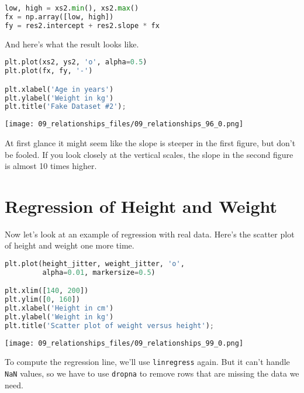 \begin{lstlisting}[language=Python,style=source]
low, high = xs2.min(), xs2.max()
fx = np.array([low, high])
fy = res2.intercept + res2.slope * fx
\end{lstlisting}

And here's what the result looks like.

\begin{lstlisting}[language=Python,style=source]
plt.plot(xs2, ys2, 'o', alpha=0.5)
plt.plot(fx, fy, '-')

plt.xlabel('Age in years')
plt.ylabel('Weight in kg')
plt.title('Fake Dataset #2');
\end{lstlisting}

\begin{center}
\texttt{[image: 09\_relationships\_files/09\_relationships\_96\_0.png]}
\end{center}

At first glance it might seem like the slope is steeper in the first
figure, but don't be fooled. If you look closely at the vertical scales,
the slope in the second figure is almost 10 times higher.

\section{Regression of Height and
Weight}\label{regression-of-height-and-weight}

Now let's look at an example of regression with real data. Here's the
scatter plot of height and weight one more time.

\begin{lstlisting}[language=Python,style=source]
plt.plot(height_jitter, weight_jitter, 'o',
         alpha=0.01, markersize=0.5)

plt.xlim([140, 200])
plt.ylim([0, 160])
plt.xlabel('Height in cm')
plt.ylabel('Weight in kg')
plt.title('Scatter plot of weight versus height');
\end{lstlisting}

\begin{center}
\texttt{[image: 09\_relationships\_files/09\_relationships\_99\_0.png]}
\end{center}

To compute the regression line, we'll use
\passthrough{\lstinline!linregress!} again. But it can't handle
\passthrough{\lstinline!NaN!} values, so we have to use
\passthrough{\lstinline!dropna!} to remove rows that are missing the
data we need.

